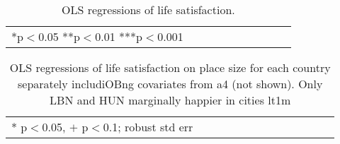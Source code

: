 \documentclass[10pt, letterpaper]{article}
\begin{document}
\begin{spacing}{1.4}
\begin{table}[H]\centering\caption{OLS regressions of life satisfaction.} \label{regA} \begin{scriptsize} \begin{tabular}{p{2.2in}p{.6in}p{.6in}p{.6in}p{.6in}|p{.6in}p{.6in}|p{.6in}p{.6in}p{.6in}p{.6 in}p{.6in}p{.6 in}}\hline  \hline\multicolumn{4}{l}{*p$<$0.05 **p$<$0.01 ***p$<$0.001} \end{tabular}\end{scriptsize}\end{table}




\begin{spacing}{.9} \begin{table}[H]\centering   \begin{scriptsize} \begin{tabular}{p{.5in}p{.5in}p{.5in}p{.5in}p{.5in}p{.5in}p{.5in}p{.5in}p{.5in}p{.5in}p{.5
                                                                      in}p{.5in}p{.5
                                                                      in}}\hline
                                                                      
                                                                      \hline *
                                                                      p$<$0.05,
                                                                      $+$
                                                                      p$<$0.1;
                                                                      robust std
                                                                      err \end{tabular}\end{scriptsize}\caption{\label{a4cou}OLS
                                                                    regressions
                                                                    of life satisfaction on
                                                                    place size
                                                                    for each
                                                                    country
                                                                    separately
                                                                    includiOBng
                                                                    covariates
                                                                    from a4 (not
                                                                    shown). Only
                                                                  LBN and HUN
                                                                  marginally
                                                                  happier in
                                                                  cities lt1m
                                                           }\end{table} \end{spacing}



\end{spacing}
\end{document}
